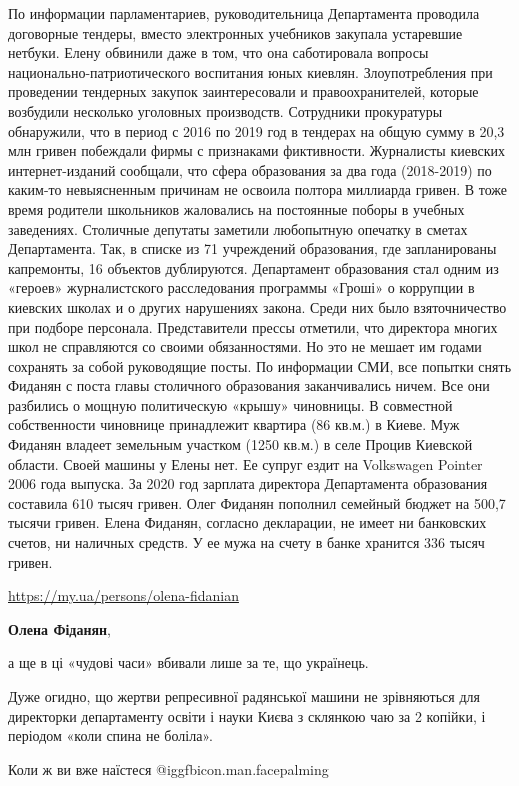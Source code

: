 \begin{itemize}
По информации парламентариев, руководительница Департамента проводила
договорные тендеры, вместо электронных учебников закупала устаревшие нетбуки.
Елену обвинили даже в том, что она саботировала вопросы
национально-патриотического воспитания юных киевлян. Злоупотребления при
проведении тендерных закупок заинтересовали и правоохранителей, которые
возбудили несколько уголовных производств. Сотрудники прокуратуры обнаружили,
что в период с 2016 по 2019 год в тендерах на общую сумму в 20,3 млн гривен
побеждали фирмы с признаками фиктивности. Журналисты киевских интернет-изданий
сообщали, что сфера образования за два года (2018-2019) по каким-то
невыясненным причинам не освоила полтора миллиарда гривен. В тоже время
родители школьников жаловались на постоянные поборы в учебных заведениях.
Столичные депутаты заметили любопытную опечатку в сметах Департамента. Так, в
списке из 71 учреждений образования, где запланированы капремонты, 16 объектов
дублируются. Департамент образования стал одним из «героев» журналистского
расследования программы «Гроші» о коррупции в киевских школах и о других
нарушениях закона. Среди них было взяточничество при подборе персонала.
Представители прессы отметили, что директора многих школ не справляются со
своими обязанностями. Но это не мешает им годами сохранять за собой руководящие
посты. По информации СМИ, все попытки снять Фиданян с поста главы столичного
образования заканчивались ничем. Все они разбились о мощную политическую
«крышу» чиновницы. В совместной собственности чиновнице принадлежит квартира
(86 кв.м.) в Киеве. Муж Фиданян владеет земельным участком (1250 кв.м.) в селе
Процив Киевской области. Своей машины у Елены нет. Ее супруг ездит на
Volkswagen Pointer 2006 года выпуска. За 2020 год зарплата директора
Департамента образования составила 610 тысяч гривен. Олег Фиданян пополнил
семейный бюджет на 500,7 тысячи гривен. Елена Фиданян, согласно декларации, не
имеет ни банковских счетов, ни наличных средств. У ее мужа на счету в банке
хранится 336 тысяч гривен.

\url{https://my.ua/persons/olena-fidanian}

\textbf{Олена Фіданян}, 

а ще в ці «чудові часи» вбивали лише за те, що українець.

Дуже огидно, що жертви репресивної радянської машини не зрівняються для
директорки департаменту освіти і науки Києва з склянкою чаю за 2 копійки, і
періодом «коли спина не боліла».

Коли ж ви вже наїстеся  @igg{fbicon.man.facepalming} 


\end{itemize}
